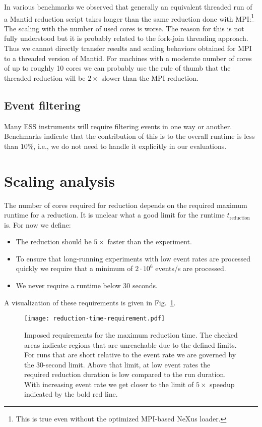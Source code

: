 \documentclass[a4paper,english,numbers=noenddot,bibliography=totoc,chapterprefix=on,DIV=12]{scrartcl}
\newcommand{\Treduction}{t_{\text{reduction}}}
\begin{document}
In various benchmarks we observed that generally an equivalent threaded run of a Mantid reduction script takes longer than the same reduction done with MPI:\footnote{This is true even without the optimized MPI-based NeXus loader.}
The scaling with the number of used cores is worse.
The reason for this is not fully understood but it is probably related to the fork-join threading approach.
Thus we cannot directly transfer results and scaling behaviors obtained for MPI to a threaded version of Mantid.
For machines with a moderate number of cores of up to roughly 10 cores we can probably use the rule of thumb that the threaded reduction will be $2\times$ slower than the MPI reduction.

\subsection{Event filtering}

Many ESS instruments will require filtering events in one way or another.
Benchmarks indicate that the contribution of this is to the overall runtime is less than $10\%$, i.e., we do not need to handle it explicitly in our evaluations.


\section{Scaling analysis}

The number of cores required for reduction depends on the required maximum runtime for a reduction.
It is unclear what a good limit for the runtime $\Treduction$ is.
For now we define:

\begin{itemize}
  \item The reduction should be $5\times$ faster than the experiment.
  \item To ensure that long-running experiments with low event rates are processed quickly we require that a minimum of $2\cdot10^6$ events/s are processed.
  \item We never require a runtime below 30 seconds.
\end{itemize}
A visualization of these requirements is given in Fig.~\ref{fig:reduction-time-requirement}.

\begin{figure}
  \centering
\texttt{[image: reduction-time-requirement.pdf]}
\caption{\label{fig:reduction-time-requirement}Imposed requirements for the maximum reduction time. The checked areas indicate regions that are unreachable due to the defined limits. For runs that are short relative to the event rate we are governed by the 30-second limit. Above that limit, at low event rates the required reduction duration is low compared to the run duration. With increasing event rate we get closer to the limit of $5\times$ speedup indicated by the bold red line.}
\end{figure}
\end{document}

